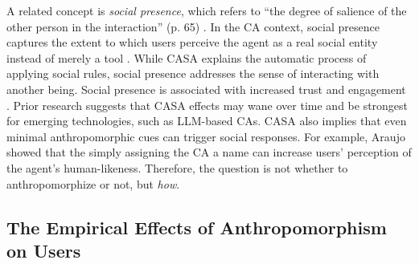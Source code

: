 \documentclass[manuscript,screen,review,anonymous]{acmart}
\DeclareRobustCommand{\change}[1]{%
    \textcolor{changeblue}{#1}%
  }
\DeclareRobustCommand{\change}[1]{#1}
\begin{document}
A related concept is \textit{social presence}, which refers to ``the degree of salience of the other person in the interaction'' (p. 65) \citep{short1976social}. In the CA context, social presence captures the extent to which users perceive the agent as a real social entity instead of merely a tool \citep{oh2018systematic}. While CASA explains the automatic process of applying social rules, social presence addresses the sense of interacting with another being. Social presence is associated with increased trust and engagement \citep{gunawardena1995social}. Prior research \cite{gambino2020building,koger2023casa} %
suggests that CASA effects may wane over time and be strongest for emerging technologies, such as LLM-based CAs. CASA also implies that even minimal anthropomorphic cues can trigger social responses. For example, Araujo \cite{araujo2018living} showed that the \change{simply} assigning the CA a name can increase users' perception of the agent's human-likeness. Therefore, the question is not whether to anthropomorphize or not, but \textit{how}.  %




\subsection{The Empirical Effects of Anthropomorphism on Users}
\end{document}
